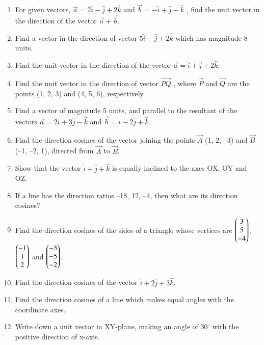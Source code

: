 \begin{enumerate}[label=\thesection.\arabic*,ref=\thesection.\theenumi]
\item For given vectors, $\vec{a}=2\hat{i}-\hat{j}+2\hat{k}$ and $\vec{b}=-\hat{i}+\hat{j}-\hat{k}$ , find the unit vector in the
direction of the vector $\vec{a}+\vec{b}$.
        \label{prob:12/10/2/9}
\\
    \solution 
		
\item Find a vector in the direction of vector $5\hat{i}-\hat{j}+2\hat{k}$ which has magnitude 8 units.
        \label{prob:12/10/2/10const}
   \\ 
    \solution 
		
\item Find the unit vector in the direction of the vector $\vec{a}=\hat{i}+\hat{j}+2\hat{k}$.
\item Find the unit vector in the direction of vector $\overrightarrow{PQ}$ , where $\vec{P}$ and $\vec{Q}$ are the points
(1, 2, 3) and (4, 5, 6), respectively.
	\item 
Find a vector of magnitude 5 units, and parallel to the resultant of the vectors $\vec{a} = 2\hat{i}+3\hat{j}-\hat{k}$ and $\vec{b} = \hat{i}-2\hat{j}+\hat{k}$.
\\
\solution
		
\item Find the direction cosines of the vector joining the points $\vec{A}$ (1, 2, –3) and
$\vec{B}$(–1, –2, 1), directed from $\vec{A}$ to $\vec{B}$.
	\\
    \solution 
		
\item Show that the vector $\hat{i}+\hat{j}+\hat{k}$ is equally inclined to the axes OX, OY and OZ.
	\\
\solution
		
\item If a line has the direction ratios –18, 12, –4, then what are its direction cosines?
		\\
		\solution
		
	\item Find the direction cosines of the sides of a triangle whose vertices are $\begin{pmatrix}3\\ 5\\-4 \end{pmatrix}$, $\begin{pmatrix} -1\\1 \\2 \end{pmatrix}$ and $\begin{pmatrix}-5 \\-5 \\-2 \end{pmatrix}$.
		\\
		\solution
		
\item Find the direction cosines of the vector $\hat{i}+2\hat{j}+3\hat{k}$.
	\\
    \solution 
		
    \item Find the direction cosines of a line which makes equal angles with the coordinate
    axes.
		\\
		\solution
		
\item Write down a unit vector in XY-plane, making an angle of 30$^{\circ}$ with the positive direction of x-axis.\\
\end{enumerate}

